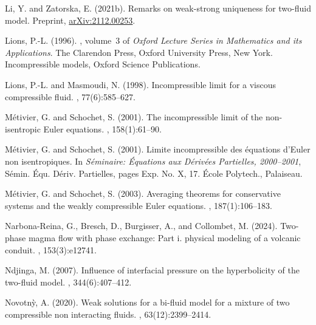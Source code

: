 \documentclass[11pt, twoside, a4paper]{article}
\theoremstyle{plain}
\theoremstyle{remark}
\numberwithin{equation}{section}
\begin{document}
\begin{thebibliography}{}
Li, Y. and Zatorska, E. (2021b).
\newblock Remarks on weak-strong uniqueness for two-fluid model.
\newblock Preprint, \href{https://arxiv.org/abs/2112.00253}{arXiv:2112.00253}.

Lions, P.-L. (1996).
, volume~3 of
  {\em Oxford Lecture Series in Mathematics and its Applications}.
\newblock The Clarendon Press, Oxford University Press, New York.
\newblock Incompressible models, Oxford Science Publications.

Lions, P.-L. and Masmoudi, N. (1998).
\newblock Incompressible limit for a viscous compressible fluid.
, 77(6):585--627.

M{\'e}tivier, G. and Schochet, S. (2001).
\newblock The incompressible limit of the non-isentropic {E}uler equations.
, 158(1):61--90.

M\'etivier, G. and Schochet, S. (2001).
\newblock Limite incompressible des \'equations d'{E}uler non isentropiques.
\newblock In {\em S\'eminaire: \'Equations aux {D}\'eriv\'ees {P}artielles,
  2000--2001}, S\'emin. \'Equ. D\'eriv. Partielles, pages Exp. No. X, 17.
  \'Ecole Polytech., Palaiseau.

M{\'e}tivier, G. and Schochet, S. (2003).
\newblock Averaging theorems for conservative systems and the weakly
  compressible {E}uler equations.
, 187(1):106--183.

Narbona-Reina, G., Bresch, D., Burgisser, A., and Collombet, M. (2024).
\newblock Two-phase magma flow with phase exchange: {P}art i. physical modeling
  of a volcanic conduit.
, 153(3):e12741.

Ndjinga, M. (2007).
\newblock Influence of interfacial pressure on the hyperbolicity of the
  two-fluid model.
, 344(6):407--412.

Novotn{\`y}, A. (2020).
\newblock Weak solutions for a bi-fluid model for a mixture of two compressible
  non interacting fluids.
, 63(12):2399--2414.


\end{thebibliography}
\end{document}
